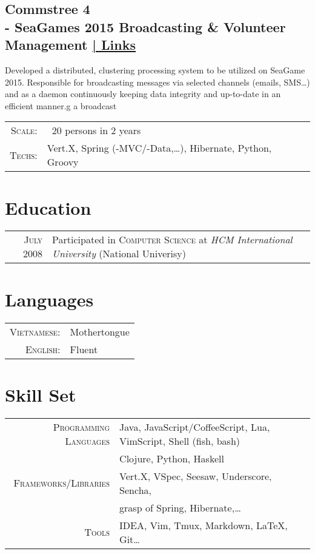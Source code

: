 \documentclass[a4paper,10pt]{article}
\begin{document}
\subsection*{Commstree 4 \\- SeaGames 2015 Broadcasting \& Volunteer Management \hfill \hyperlink{ct-links} { | \footnotesize Links}}

Developed a distributed, clustering processing system to be utilized on SeaGame 2015. Responsible for broadcasting messages via selected channels (emails, SMS\ldots) and as a daemon continuously keeping data integrity and up-to-date in an efficient manner.g a broadcast

\begin{tabular}{rl}
    \textsc{Scale:} & ~20 persons in 2 years\\
    \textsc{Techs:} & Vert.X, Spring (-MVC/-Data,\ldots), Hibernate, Python, Groovy
\end{tabular}


\section{Education}
\begin{tabular}{rl}	
    \textsc{July} 2008 & Participated in \textsc{Computer Science} at \textit{HCM International University} (National Univerisy)
\end{tabular}

\section{Languages}
\begin{tabular}{rl}
 \textsc{Vietnamese:}&Mothertongue\\
\textsc{English:}&Fluent\\
\end{tabular}

\section{Skill Set}
\begin{tabular}{rl}
    \textsc{Programming Languages} & Java, JavaScript/CoffeeScript, Lua, VimScript, Shell (fish, bash)\\
                                   & Clojure, Python, Haskell\\
    \textsc{Frameworks/Libraries} & Vert.X, VSpec, Seesaw, Underscore, Sencha,\\
                                  & grasp of Spring, Hibernate,\ldots\\
    \textsc{Tools} & IDEA, Vim, Tmux, Markdown, \LaTeX, Git\ldots\\
\end{tabular}
\end{document}
